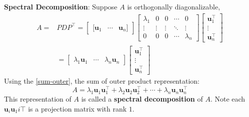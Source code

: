     \begin{Thm}
        \textbf{Spectral Decomposition}:
        Suppose $A$ is orthogonally diagonalizable,
        \begin{align*}
            A =& PDP^{\top} = \begin{bmatrix}
                [\mathbf{u}_1 & \cdots & \mathbf{u}_n] 
            \end{bmatrix} \begin{bmatrix}
                \lambda_1 & 0 & 0 & \cdots & 0 \\
                \vdots & \vdots & \vdots & \ddots & \vdots \\
                0 & 0 & 0 & \cdots & \lambda_n
                \end{bmatrix} \begin{bmatrix}
                    \mathbf{u}_1^{\top}\\
                    \vdots\\
                    \mathbf{u}_n^{\top}
                \end{bmatrix}\\
                & = \begin{bmatrix}
                \lambda_1 \mathbf{u}_1 & \cdots & \lambda_n \mathbf{u}_n
            \end{bmatrix} \begin{bmatrix}
                    \mathbf{u}_1^{\top}\\
                    \vdots\\
                    \mathbf{u}_n^{\top}
                \end{bmatrix}
        \end{align*}
        Using the \cref{sum-outer}, the sum of outer product representation:
        \begin{equation}
            A = \lambda_1\mathbf{u}_1\mathbf{u}_1^{\top} + \lambda_2\mathbf{u}_2\mathbf{u}_2^{\top} + \cdots + \lambda_n\mathbf{u}_n\mathbf{u}_n^{\top}
        \end{equation}
        This representation of $A$ is called a \textbf{spectral decomposition} of $A$. Note each $\mathbf{u}_i\mathbf{u}_1i{\top}$ is a projection matrix with rank $1$.
    \end{Thm}
